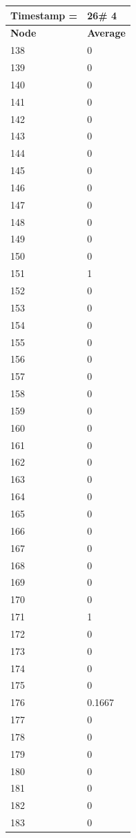 \begin{tabular}{|l||l|}
\hline
\textbf{Timestamp =} & \textbf{26}\# 4\\\hline
	\textbf{Node} & \textbf{Average} \\ \hline
\hline
	138 & 0 \\ \hline
	139 & 0 \\ \hline
	140 & 0 \\ \hline
	141 & 0 \\ \hline
	142 & 0 \\ \hline
	143 & 0 \\ \hline
	144 & 0 \\ \hline
	145 & 0 \\ \hline
	146 & 0 \\ \hline
	147 & 0 \\ \hline
	148 & 0 \\ \hline
	149 & 0 \\ \hline
	150 & 0 \\ \hline
	151 & 1 \\ \hline
	152 & 0 \\ \hline
	153 & 0 \\ \hline
	154 & 0 \\ \hline
	155 & 0 \\ \hline
	156 & 0 \\ \hline
	157 & 0 \\ \hline
	158 & 0 \\ \hline
	159 & 0 \\ \hline
	160 & 0 \\ \hline
	161 & 0 \\ \hline
	162 & 0 \\ \hline
	163 & 0 \\ \hline
	164 & 0 \\ \hline
	165 & 0 \\ \hline
	166 & 0 \\ \hline
	167 & 0 \\ \hline
	168 & 0 \\ \hline
	169 & 0 \\ \hline
	170 & 0 \\ \hline
	171 & 1 \\ \hline
	172 & 0 \\ \hline
	173 & 0 \\ \hline
	174 & 0 \\ \hline
	175 & 0 \\ \hline
	176 & 0.1667 \\ \hline
	177 & 0 \\ \hline
	178 & 0 \\ \hline
	179 & 0 \\ \hline
	180 & 0 \\ \hline
	181 & 0 \\ \hline
	182 & 0 \\ \hline
	183 & 0 \\ \hline
\end{tabular}
